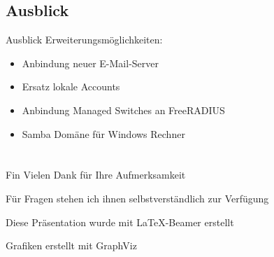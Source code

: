 \documentclass[presentation,svgnames,12pt]{beamer}
\begin{document}
\subsection{Ausblick}
\begin{frame}{Ausblick}
Erweiterungsmöglichkeiten:
\vspace{6pt}
	\begin{itemize}
		\item Anbindung neuer E-Mail-Server
		\item Ersatz lokale Accounts
		\item Anbindung Managed Switches an FreeRADIUS
		\item Samba Domäne für Windows Rechner
	\end{itemize}
\end{frame}


\section{} %
\begin{frame}{Fin}
	\bigskip\bigskip\bigskip\bigskip\bigskip\bigskip
	Vielen Dank für Ihre Aufmerksamkeit
	
	Für Fragen stehen ich ihnen selbstverständlich zur Verfügung
	
	\bigskip\bigskip\bigskip
	\bigskip
	\bigskip
	\bigskip Diese Präsentation wurde mit \LaTeX{}-Beamer erstellt
	
	Grafiken erstellt mit GraphViz
\end{frame}


\end{document}
